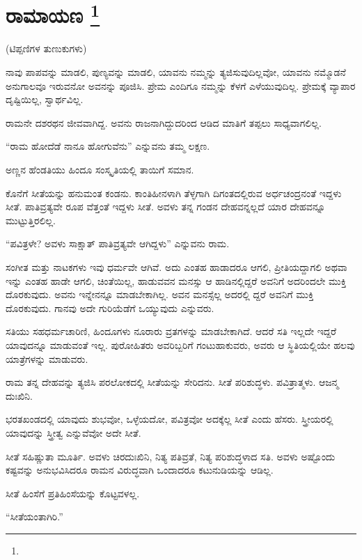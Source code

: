
\chapter[ರಾಮಾಯಣ ]{ರಾಮಾಯಣ \protect\footnote{}}

\centerline{(ಟಿಪ್ಪಣಿಗಳ ತುಣುಕುಗಳು)}

ನಾವು ಪಾಪವನ್ನು ಮಾಡಲಿ, ಪುಣ್ಯವನ್ನು ಮಾಡಲಿ, ಯಾವನು ನಮ್ಮನ್ನು ತ್ಯಜಿಸುವುದಿಲ್ಲವೋ, ಯಾವನು ನಮ್ಮೊಡನೆ ಅನುಗಾಲವೂ ಇರುವನೋ ಅವನನ್ನು ಪೂಜಿಸಿ. ಪ್ರೇಮ ಎಂದಿಗೂ ನಮ್ಮನ್ನು ಕೆಳಗೆ ಎಳೆಯುವುದಿಲ್ಲ. ಪ್ರೇಮಕ್ಕೆ ವ್ಯಾಪಾರ ದೃಷ್ಟಿಯಿಲ್ಲ, ಸ್ವಾರ್ಥವಿಲ್ಲ.

ರಾಮನೇ ದಶರಥನ ಜೀವವಾಗಿದ್ದ. ಅವನು ರಾಜನಾಗಿದ್ದುದರಿಂದ ಆಡಿದ ಮಾತಿಗೆ ತಪ್ಪಲು ಸಾಧ್ಯವಾಗಲಿಲ್ಲ.

“ರಾಮ ಹೋದೆಡೆ ನಾನೂ ಹೋಗುವೆನು” ಎನ್ನುವನು ತಮ್ಮ ಲಕ್ಷಣ.

ಅಣ್ಣನ ಹೆಂಡತಿಯು ಹಿಂದೂ ಸಂಸ್ಕೃತಿಯಲ್ಲಿ ತಾಯಿಗೆ ಸಮಾನ.

ಕೊನೆಗೆ ಸೀತೆಯನ್ನು ಹನುಮಂತ ಕಂಡನು. ಕಾಂತಿಹೀನಳಾಗಿ ತೆಳ್ಳಗಾಗಿ ದಿಗಂತದಲ್ಲಿರುವ ಅರ್ಧಚಂದ್ರನಂತೆ ಇದ್ದಳು ಸೀತೆ. ಪಾತಿವ್ರತ್ಯವೇ ರೂಪ ವೆತ್ತಂತೆ ಇದ್ದಳು ಸೀತೆ. ಅವಳು ತನ್ನ ಗಂಡನ ದೇಹವನ್ನಲ್ಲದೆ ಯಾರ ದೇಹವನ್ನೂ ಮುಟ್ಟುತ್ತಿರಲಿಲ್ಲ.

“ಪವಿತ್ರಳೇ? ಅವಳು ಸಾಕ್ಷಾತ್​ ಪಾತಿವ್ರತ್ಯವೇ ಆಗಿದ್ದಳು” ಎನ್ನುವನು ರಾಮ.

ಸಂಗೀತ ಮತ್ತು ನಾಟಕಗಳು ಇವು ಧರ್ಮವೇ ಆಗಿವೆ. ಅದು ಎಂತಹ ಹಾಡಾದರೂ ಆಗಲಿ, ಪ್ರೀತಿಯದ್ದಾಗಲಿ ಅಥವಾ ಇನ್ನು ಎಂತಹ ಹಾಡೇ ಆಗಲಿ, ಚಿಂತೆಯಿಲ್ಲ, ಹಾಡುವವನ ಮನಸ್ಸು ಆ ಹಾಡಿನಲ್ಲಿದ್ದರೆ ಅವನಿಗೆ ಅದರಿಂದಲೇ ಮುಕ್ತಿ ದೊರಕುವುದು. ಅವನು ಇನ್ನೇನನ್ನೂ ಮಾಡಬೇಕಾಗಿಲ್ಲ. ಅವನ ಮನಸ್ಸೆಲ್ಲ ಅದರಲ್ಲಿ ದ್ದರೆ ಅವನಿಗೆ ಮುಕ್ತಿ ದೊರಕುವುದು. ಗಾನವು ಅದೇ ಗುರಿಯೆಡೆಗೆ ಒಯ್ಯುವುದು ಎನ್ನುವರು.

ಸತಿಯು ಸಹಧರ್ಮಚಾರಿಣಿ, ಹಿಂದೂಗಳು ನೂರಾರು ವ್ರತಗಳನ್ನು ಮಾಡಬೇಕಾಗಿದೆ. ಆದರೆ ಸತಿ ಇಲ್ಲದೇ ಇದ್ದರೆ ಯಾವುದನ್ನೂ ಮಾಡುವಂತೆ ಇಲ್ಲ. ಪುರೋಹಿತರು ಅವರಿಬ್ಬರಿಗೆ ಗಂಟುಹಾಕುವರು, ಅವರು ಆ ಸ್ಥಿತಿಯಲ್ಲಿಯೇ ಹಲವು ಯಾತ್ರೆಗಳನ್ನು ಮಾಡುವರು.

ರಾಮ ತನ್ನ ದೇಹವನ್ನು ತ್ಯಜಿಸಿ ಪರಲೋಕದಲ್ಲಿ ಸೀತೆಯನ್ನು ಸೇರಿದನು. ಸೀತೆ ಪರಿಶುದ್ಧಳು. ಪವಿತ್ರಾತ್ಮಳು. ಆಜನ್ಮ ದುಃಖಿನಿ.

ಭರತಖಂಡದಲ್ಲಿ ಯಾವುದು ಶುಭವೋ, ಒಳ್ಳೆಯದೋ, ಪವಿತ್ರವೋ ಅದಕ್ಕೆಲ್ಲ ಸೀತೆ ಎಂದು ಹೆಸರು. ಸ್ತ್ರೀಯರಲ್ಲಿ ಯಾವುದನ್ನು ಸ್ತ್ರೀತ್ವ ಎನ್ನುವೆವೋ ಅದೇ ಸೀತೆ.

ಸೀತೆ ಸಹಿಷ್ಣುತಾ ಮೂರ್ತಿ. ಅವಳು ಚಿರದುಃಖಿನಿ, ನಿತ್ಯ ಪತಿವ್ರತೆ, ನಿತ್ಯ ಪರಿಶುದ್ಧಳಾದ ಸತಿ. ಅವಳು ಅಷ್ಟೊಂದು ಕಷ್ಟವನ್ನು ಅನುಭವಿಸಿದರೂ ರಾಮನ ವಿರುದ್ಧವಾಗಿ ಒಂದಾದರೂ ಕಟುನುಡಿಯನ್ನು ಆಡಿಲ್ಲ.

ಸೀತೆ ಹಿಂಸೆಗೆ ಪ್ರತಿಹಿಂಸೆಯನ್ನು ಕೊಟ್ಟವಳಲ್ಲ.

“ಸೀತೆಯಂತಾಗಿರಿ.”

